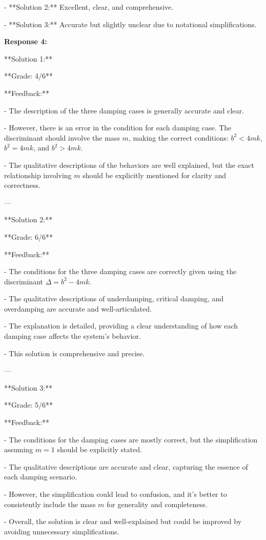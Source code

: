 \documentclass[a4paper,11pt]{article}
\begin{document}
- **Solution 2:** Excellent, clear, and comprehensive.

- **Solution 3:** Accurate but slightly unclear due to notational simplifications.

\bigskip
\textbf{Response 4:}

**Solution 1:**

**Grade: 4/6**

**Feedback:** 

- The description of the three damping cases is generally accurate and clear.

- However, there is an error in the condition for each damping case. The discriminant should involve the mass \( m \), making the correct conditions: \( b^2 < 4mk \), \( b^2 = 4mk \), and \( b^2 > 4mk \).

- The qualitative descriptions of the behaviors are well explained, but the exact relationship involving \( m \) should be explicitly mentioned for clarity and correctness.

---

**Solution 2:**

**Grade: 6/6**

**Feedback:**

- The conditions for the three damping cases are correctly given using the discriminant \(\Delta = b^2 - 4mk\).

- The qualitative descriptions of underdamping, critical damping, and overdamping are accurate and well-articulated.

- The explanation is detailed, providing a clear understanding of how each damping case affects the system's behavior.

- This solution is comprehensive and precise.

---

**Solution 3:**

**Grade: 5/6**

**Feedback:**

- The conditions for the damping cases are mostly correct, but the simplification assuming \( m = 1 \) should be explicitly stated.

- The qualitative descriptions are accurate and clear, capturing the essence of each damping scenario.

- However, the simplification could lead to confusion, and it's better to consistently include the mass \( m \) for generality and completeness.

- Overall, the solution is clear and well-explained but could be improved by avoiding unnecessary simplifications.
\end{document}
